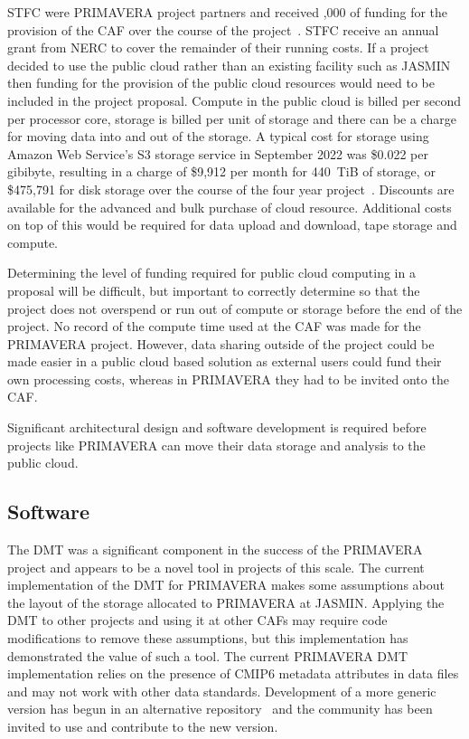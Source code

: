 \documentclass[gmd, manuscript]{copernicus}
\begin{document}
STFC were PRIMAVERA project partners and received ,000 of funding for the provision of the CAF over the course of the project~\citep{Bennett2020}. STFC receive an annual grant from NERC to cover the remainder of their running costs. If a project decided to use the public cloud rather than an existing facility such as JASMIN then funding for the provision of the public cloud resources would need to be included in the project proposal. Compute in the public cloud is billed per second per processor core, storage is billed per unit of storage and there can be a charge for moving data into and out of the storage. A typical cost for storage using Amazon Web Service's S3 storage service in September 2022 was \$0.022 per gibibyte, resulting in a charge of \$9,912 per month for 440~TiB of storage, or \$475,791 for disk storage over the course of the four year project~\citep{aws_calculator}. Discounts are available for the advanced and bulk purchase of cloud resource. Additional costs on top of this would be required for data upload and download, tape storage and compute.

Determining the level of funding required for public cloud computing in a proposal will be difficult, but important to correctly determine so that the project does not overspend or run out of compute or storage before the end of the project. No record of the compute time used at the CAF was made for the PRIMAVERA project. However, data sharing outside of the project could be made easier in a public cloud based solution as external users could fund their own processing costs, whereas in PRIMAVERA they had to be invited onto the CAF.

Significant architectural design and software development is required before projects like PRIMAVERA can move their data storage and analysis to the public cloud.

\subsection{Software}

The DMT was a significant component in the success of the PRIMAVERA project and appears to be a novel tool in projects of this scale. The current implementation of the DMT for PRIMAVERA makes some assumptions about the layout of the storage allocated to PRIMAVERA at JASMIN. Applying the DMT to other projects and using it at other CAFs may require code modifications to remove these assumptions, but this implementation has demonstrated the value of such a tool. The current PRIMAVERA DMT implementation relies on the presence of CMIP6 metadata attributes in data files and may not work with other data standards. Development of a more generic version has begun in an alternative repository~\citep{generic_dmt} and the community has been invited to use and contribute to the new version.
\end{document}
